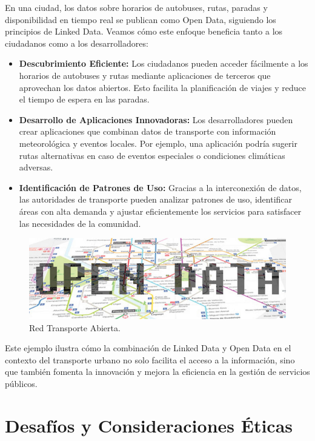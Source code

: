 \documentclass[11pt]{report}
\begin{document}
En una ciudad, los datos sobre horarios de autobuses, rutas, paradas y disponibilidad en tiempo real se publican como Open Data, siguiendo los principios de Linked Data. Veamos cómo este enfoque beneficia tanto a los ciudadanos como a los desarrolladores:

\begin{itemize}
    \item \textbf{Descubrimiento Eficiente:} Los ciudadanos pueden acceder fácilmente a los horarios de autobuses y rutas mediante aplicaciones de terceros que aprovechan los datos abiertos. Esto facilita la planificación de viajes y reduce el tiempo de espera en las paradas.
    
    \item \textbf{Desarrollo de Aplicaciones Innovadoras:} Los desarrolladores pueden crear aplicaciones que combinan datos de transporte con información meteorológica y eventos locales. Por ejemplo, una aplicación podría sugerir rutas alternativas en caso de eventos especiales o condiciones climáticas adversas.
    
    \item \textbf{Identificación de Patrones de Uso:} Gracias a la interconexión de datos, las autoridades de transporte pueden analizar patrones de uso, identificar áreas con alta demanda y ajustar eficientemente los servicios para satisfacer las necesidades de la comunidad.
\end{itemize}

\begin{figure}[H]
	\centering
	\includegraphics[scale=0.4]{../img/transport.jpg}
	\caption{Red Transporte Abierta.}
	\label{fig:opendata}
\end{figure}

Este ejemplo ilustra cómo la combinación de Linked Data y Open Data en el contexto del transporte urbano no solo facilita el acceso a la información, sino que también fomenta la innovación y mejora la eficiencia en la gestión de servicios públicos.


\section{Desafíos y Consideraciones Éticas}
\end{document}
